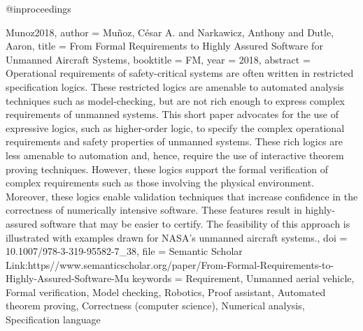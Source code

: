 @inproceedings{Munoz2018,
  author    = {Muñoz, César A. and Narkawicz, Anthony and Dutle, Aaron},
  title     = {From {Formal} {Requirements} to {Highly} {Assured} {Software} for {Unmanned} {Aircraft} {Systems}},
  booktitle = {{FM}},
  year      = {2018},
  abstract  = {Operational requirements of safety-critical systems are often written in restricted specification logics. These restricted logics are amenable to automated analysis techniques such as model-checking, but are not rich enough to express complex requirements of unmanned systems. This short paper advocates for the use of expressive logics, such as higher-order logic, to specify the complex operational requirements and safety properties of unmanned systems. These rich logics are less amenable to automation and, hence, require the use of interactive theorem proving techniques. However, these logics support the formal verification of complex requirements such as those involving the physical environment. Moreover, these logics enable validation techniques that increase confidence in the correctness of numerically intensive software. These features result in highly-assured software that may be easier to certify. The feasibility of this approach is illustrated with examples drawn for NASA’s unmanned aircraft systems.},
  doi       = {10.1007/978-3-319-95582-7_38},
  file      = {Semantic Scholar Link:https\://www.semanticscholar.org/paper/From-Formal-Requirements-to-Highly-Assured-Software-Mu%
  keywords  = {Requirement, Unmanned aerial vehicle, Formal verification, Model checking, Robotics, Proof assistant, Automated theorem proving, Correctness (computer science), Numerical analysis, Specification language}
}

}
